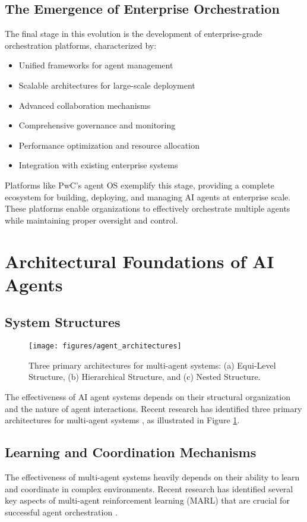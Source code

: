 \documentclass[conference]{IEEEtran}
\begin{document}
\subsection{The Emergence of Enterprise Orchestration}
The final stage in this evolution is the development of enterprise-grade orchestration platforms, characterized by:
\begin{itemize}
\item Unified frameworks for agent management
\item Scalable architectures for large-scale deployment
\item Advanced collaboration mechanisms
\item Comprehensive governance and monitoring
\item Performance optimization and resource allocation
\item Integration with existing enterprise systems
\end{itemize}

Platforms like PwC's agent OS \cite{pwc2025agentos} exemplify this stage, providing a complete ecosystem for building, deploying, and managing AI agents at enterprise scale. These platforms enable organizations to effectively orchestrate multiple agents while maintaining proper oversight and control.

\section{Architectural Foundations of AI Agents}
\subsection{System Structures}
\begin{figure}[t]
\centering
\texttt{[image: figures/agent\_architectures]}
\caption{Three primary architectures for multi-agent systems: (a) Equi-Level Structure, (b) Hierarchical Structure, and (c) Nested Structure.}
\label{fig:architectures}
\end{figure}

The effectiveness of AI agent systems depends on their structural organization and the nature of agent interactions. Recent research has identified three primary architectures for multi-agent systems \cite{han2024multiagent}, as illustrated in Figure \ref{fig:architectures}.

\subsection{Learning and Coordination Mechanisms}
The effectiveness of multi-agent systems heavily depends on their ability to learn and coordinate in complex environments. Recent research has identified several key aspects of multi-agent reinforcement learning (MARL) that are crucial for successful agent orchestration \cite{huh2024multiagent}.
\end{document}
